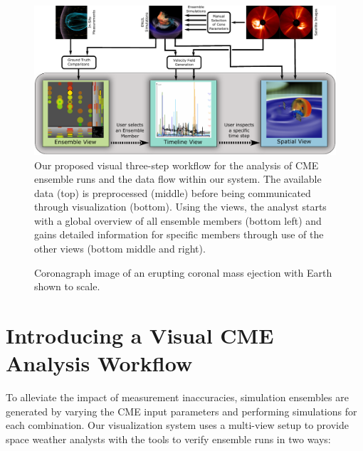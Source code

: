 \documentclass[journal]{vgtc}                %
\begin{document}
\begin{figure}
\centering
\includegraphics[width=\linewidth]{figures/workflow.pdf}
\caption{Our proposed visual three-step workflow for the analysis of CME ensemble runs and the data flow within our system. The available data (top) is preprocessed (middle) before being communicated through visualization (bottom). Using the views, the analyst starts with a global overview of all ensemble members (bottom left) and gains detailed information for specific members through use of the other views (bottom middle and right).}
\label{fig:workflow}
\end{figure}

\begin{figure}[!b]
\centering
\caption{Coronagraph image of an erupting coronal mass ejection with Earth shown to scale.}
\label{fig:cme}
\end{figure}


\section{Introducing a Visual CME Analysis Workflow}
To alleviate the impact of measurement inaccuracies, simulation ensembles are generated by varying the CME input parameters and performing simulations for each combination. Our visualization system uses a multi-view setup to provide space weather analysts with the tools to verify ensemble runs in two ways:
\end{document}
